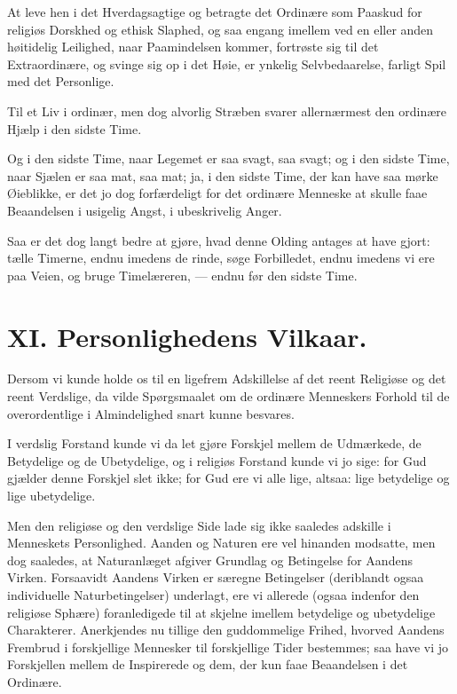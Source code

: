 \documentclass[12pt,a4paper]{book}
\newcommand{\apage}[1]{\marginnote{\footnotesize\textit{[#1]}}}
\begin{document}
At leve hen i det Hverdagsagtige og betragte det Ordinære som Paaskud for
religiøs Dorskhed og ethisk Slaphed, og saa engang imellem ved en eller
anden høitidelig Leilighed, naar Paamindelsen kommer, fortrøste sig til det
Extraordinære, og svinge sig op i det Høie, er ynkelig Selvbedaarelse,
farligt Spil med det Personlige.

Til et Liv i ordinær, men dog alvorlig Stræben svarer allernærmest den
ordinære Hjælp i den sidste Time.

Og i den sidste Time, naar Legemet er saa svagt, saa svagt; og i den
sidste Time, naar Sjælen er saa mat, saa
mat; ja, i den sidste Time, der kan have saa mørke Øieblikke, er det jo dog
forfærdeligt for det ordinære Menneske at skulle \apage{117} faae Beaandelsen i
usigelig Angst, i ubeskrivelig Anger.

Saa er det dog langt bedre at gjøre, hvad denne Olding antages at have
gjort: tælle Timerne, endnu imedens de rinde, søge Forbilledet, endnu
imedens vi ere paa Veien, og bruge Timelæreren, --- endnu før den sidste
Time.

\chapter*{XI. Personlighedens Vilkaar.}
\label{ch:forel11} \apage{118}

Dersom vi kunde holde os til en ligefrem Adskillelse af det reent Religiøse
og det reent Verdslige, da vilde Spørgsmaalet om de ordinære Menneskers
Forhold til de overordentlige i Almindelighed snart kunne besvares.

I verdslig Forstand kunde vi da let gjøre Forskjel mellem de Udmærkede, de
Betydelige og de Ubetydelige, og i religiøs Forstand kunde vi jo sige: for
Gud gjælder denne Forskjel slet ikke; for Gud ere vi alle lige, altsaa:
lige betydelige og lige ubetydelige.

Men den religiøse og den verdslige Side lade sig ikke saaledes adskille i
Menneskets Personlighed. Aanden og Naturen ere vel hinanden modsatte, men
dog saaledes, at Naturanlæget afgiver Grundlag og Betingelse for Aandens
Virken. Forsaavidt Aandens Virken er særegne Betingelser (deriblandt ogsaa
individuelle Naturbetingelser) underlagt, ere vi allerede (ogsaa indenfor
den religiøse Sphære) foranledigede til at skjelne imellem betydelige og
ubetydelige Charakterer. Anerkjendes nu tillige den guddommelige Frihed,
hvorved Aandens Frembrud i forskjellige Mennesker til forskjellige Tider
bestemmes; saa have vi jo Forskjellen mellem de Inspirerede og dem, der
kun faae Beaandelsen i det Ordinære.
\end{document}
